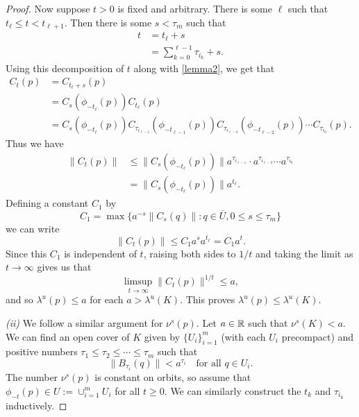 \begin{proof}
	Now suppose \(t>0\) is fixed and arbitrary. There is some \(\ell\) such that \(t_\ell \leq t < t_{\ell+1}\). Then there is some \(s < \tau_m\) such that 
	\begin{equation}
		\begin{aligned}
			t &= t_\ell + s \\
			&= \sum_{k=0}^{\ell - 1} \tau_{i_k} +s .
		\end{aligned}
	\end{equation}
	Using this decomposition of \(t\) along with \cref{lemma2}, we get that
	\begin{equation}
		\begin{aligned}
			C_t(p) &= C_{t_\ell+s}(p) \\
			&= C_s( \phi_{-t_\ell}(p) ) C_{t_\ell} (p) \\
			&= C_s( \phi_{-t_\ell}(p) ) C_{\tau_{i_{\ell-1}}}(\phi_{-t_{\ell-1}}(p)) C_{\tau_{i_{\ell-2}}}(\phi_{-t_{\ell-2}}(p)) \cdots C_{\tau_{i_0}}(p).
		\end{aligned}
	\end{equation}
	Thus we have
	\begin{equation}
		\begin{aligned}
			\| C_t(p) \| &\leq \| C_s(\phi_{-t_\ell}(p)) \| a^{\tau_{i_{\ell -1}}} \cdot a^{\tau_{i_{\ell-2}}} \cdots a^{\tau_{i_0}} \\
			&= \| C_s(\phi_{-t_\ell}(p)) \| a^{t_\ell}.
		\end{aligned}
	\end{equation}
	Defining a constant \(C_1\) by 
	\begin{equation}
		C_1 = \max\{ a^{-s} \| C_s(q) \| : q\in \overline U , 0 \leq s \leq \tau_m\}
	\end{equation}
	we can write
	\begin{equation}
		\|C_t(p) \| \leq C_1 a^s a^{t_\ell} = C_1 a^t.
	\end{equation}
	Since this \(C_1\) is independent of \(t\), raising both sides to \(1/t\) and taking the limit as \(t\to\infty\) gives us that 
	\begin{equation}
		\limsup_{t \to \infty} \| C_t(p) \| ^{1/t} \leq a,
	\end{equation}
	and so \(\lambda^u(p) \leq a\) for each \(a > \lambda^u(K).\) This proves \(\lambda^u(p) \leq \lambda^u(K)\).
	
	\emph{(ii)} We follow a similar argument for \(\nu^s(p)\). Let \(a\in \mathbb{R}\) such that \(\nu^s(K) < a\). We can find an open cover of \(K\) given by \(\{U_i\}_{i=1}^m\) (with each \(U_i\) precompact) and positive numbers \(\tau_1 \leq \tau_2\leq \cdots \leq \tau_m\) such that
	\begin{equation}
		\| B_{\tau_i}(q) \| < a^{\tau_i} \quad \text{for all } q\in U_i.
	\end{equation}
	The number \(\nu^s(p)\) is constant on orbits, so assume that \(\phi_{-t}(p) \in U := \cup_{i=1}^m U_i \) for all \(t\geq 0\). We can similarly construct the \(t_k\) and \(\tau_{i_k}\) inductively.
	

\end{proof}
